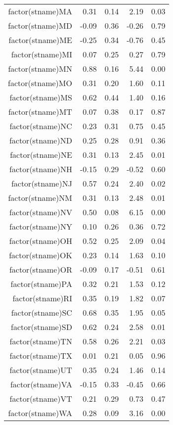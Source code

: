 \begin{table}[ht]
\begin{tabular}{rrrrr}
  factor(stname)MA & 0.31 & 0.14 & 2.19 & 0.03 \\ 
  factor(stname)MD & -0.09 & 0.36 & -0.26 & 0.79 \\ 
  factor(stname)ME & -0.25 & 0.34 & -0.76 & 0.45 \\ 
  factor(stname)MI & 0.07 & 0.25 & 0.27 & 0.79 \\ 
  factor(stname)MN & 0.88 & 0.16 & 5.44 & 0.00 \\ 
  factor(stname)MO & 0.31 & 0.20 & 1.60 & 0.11 \\ 
  factor(stname)MS & 0.62 & 0.44 & 1.40 & 0.16 \\ 
  factor(stname)MT & 0.07 & 0.38 & 0.17 & 0.87 \\ 
  factor(stname)NC & 0.23 & 0.31 & 0.75 & 0.45 \\ 
  factor(stname)ND & 0.25 & 0.28 & 0.91 & 0.36 \\ 
  factor(stname)NE & 0.31 & 0.13 & 2.45 & 0.01 \\ 
  factor(stname)NH & -0.15 & 0.29 & -0.52 & 0.60 \\ 
  factor(stname)NJ & 0.57 & 0.24 & 2.40 & 0.02 \\ 
  factor(stname)NM & 0.31 & 0.13 & 2.48 & 0.01 \\ 
  factor(stname)NV & 0.50 & 0.08 & 6.15 & 0.00 \\ 
  factor(stname)NY & 0.10 & 0.26 & 0.36 & 0.72 \\ 
  factor(stname)OH & 0.52 & 0.25 & 2.09 & 0.04 \\ 
  factor(stname)OK & 0.23 & 0.14 & 1.63 & 0.10 \\ 
  factor(stname)OR & -0.09 & 0.17 & -0.51 & 0.61 \\ 
  factor(stname)PA & 0.32 & 0.21 & 1.53 & 0.12 \\ 
  factor(stname)RI & 0.35 & 0.19 & 1.82 & 0.07 \\ 
  factor(stname)SC & 0.68 & 0.35 & 1.95 & 0.05 \\ 
  factor(stname)SD & 0.62 & 0.24 & 2.58 & 0.01 \\ 
  factor(stname)TN & 0.58 & 0.26 & 2.21 & 0.03 \\ 
  factor(stname)TX & 0.01 & 0.21 & 0.05 & 0.96 \\ 
  factor(stname)UT & 0.35 & 0.24 & 1.46 & 0.14 \\ 
  factor(stname)VA & -0.15 & 0.33 & -0.45 & 0.66 \\ 
  factor(stname)VT & 0.21 & 0.29 & 0.73 & 0.47 \\ 
  factor(stname)WA & 0.28 & 0.09 & 3.16 & 0.00 \\ 

\end{tabular}
\end{table}
